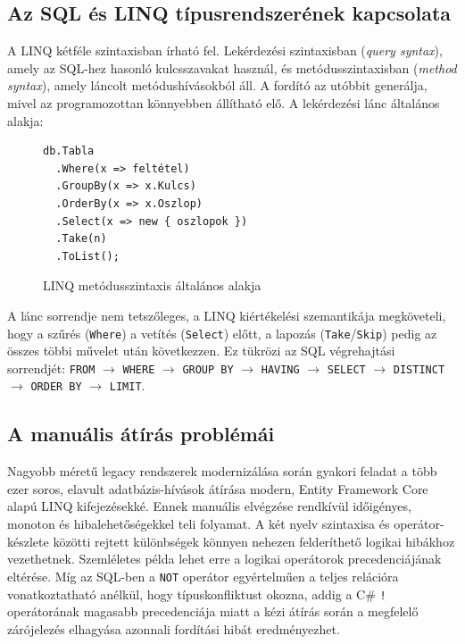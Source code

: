 \documentclass[a4paper,12pt]{article}
\begin{document}
\subsection{Az SQL és LINQ típusrendszerének kapcsolata}

A LINQ kétféle szintaxisban írható fel. Lekérdezési szintaxisban (\emph{query syntax}), amely az SQL-hez hasonló kulcsszavakat használ, és metódusszintaxisban (\emph{method syntax}), amely láncolt metódushívásokból áll. A fordító az utóbbit generálja, mivel az programozottan könnyebben állítható elő. A lekérdezési lánc általános alakja:

\begin{figure}[H]
\begin{lstlisting}
db.Tabla
  .Where(x => feltétel)
  .GroupBy(x => x.Kulcs)
  .OrderBy(x => x.Oszlop)
  .Select(x => new { oszlopok })
  .Take(n)
  .ToList();
\end{lstlisting}
\caption{LINQ metódusszintaxis általános alakja}
\end{figure}
 
A lánc sorrendje nem tetszőleges, a LINQ kiértékelési szemantikája megköveteli, hogy a szűrés (\texttt{Where}) a vetítés (\texttt{Select}) előtt, a lapozás (\texttt{Take}/\texttt{Skip}) pedig az összes többi művelet után következzen. Ez tükrözi az SQL végrehajtási sorrendjét: 
\texttt{FROM} $\to$ \texttt{WHERE} $\to$ \texttt{GROUP BY} $\to$ \texttt{HAVING} $\to$ \texttt{SELECT} $\to$ \texttt{DISTINCT} $\to$ \texttt{ORDER BY} $\to$ \texttt{LIMIT}.

\subsection{A manuális átírás problémái}

Nagyobb méretű legacy rendszerek modernizálása során gyakori feladat a több ezer soros, elavult adatbázis-hívások átírása modern, Entity Framework Core alapú LINQ kifejezésekké. Ennek manuális elvégzése rendkívül időigényes, monoton és hibalehetőségekkel teli folyamat. A két nyelv szintaxisa és operátor-készlete közötti rejtett különbségek könnyen nehezen felderíthető logikai hibákhoz vezethetnek. Szemléletes példa lehet erre a logikai operátorok precedenciájának eltérése. Míg az SQL-ben a \texttt{NOT} operátor egyértelműen a teljes relációra vonatkoztatható anélkül, hogy típuskonfliktust okozna, addig a C\# \texttt{!} operátorának magasabb precedenciája miatt a kézi átírás során a megfelelő zárójelezés elhagyása azonnali fordítási hibát eredményezhet.
\end{document}
